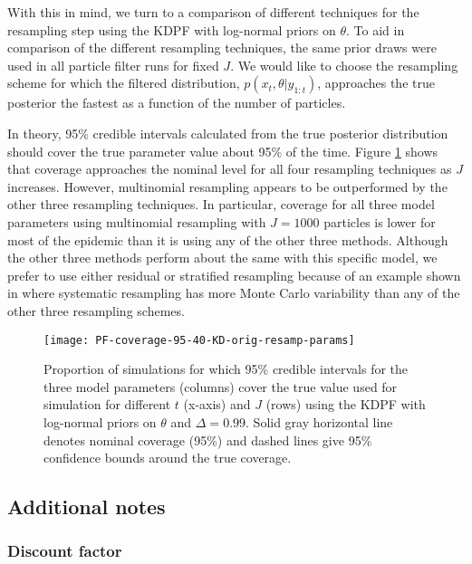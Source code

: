 \documentclass{elsarticle}
\begin{document}
With this in mind, we turn to a comparison of different techniques for the resampling step using the KDPF with log-normal priors on $\theta$. To aid in comparison of the different resampling techniques, the same prior draws were used in all particle filter runs for fixed $J$. We would like to choose the resampling scheme for which the filtered distribution, $p(x_t,\theta|y_{1:t})$, approaches the true posterior the fastest as a function of the number of particles.

In theory, 95\% credible intervals calculated from the true posterior distribution should cover the true parameter value about 95\% of the time. Figure \ref{fig:resamp} shows that coverage approaches the nominal level for all four resampling techniques as $J$ increases. However, multinomial resampling appears to be outperformed by the other three resampling techniques.  In particular, coverage for all three model parameters using multinomial resampling with $J = 1000$ particles is lower for most of the epidemic than it is using any of the other three methods. Although the other three methods perform about the same with this specific model, we prefer to use either residual or stratified resampling because of an example shown in \cite{Douc:Capp:Moul:comp:2005} where systematic resampling has more Monte Carlo variability than any of the other three resampling schemes.

\begin{figure}
\centering
\texttt{[image: PF-coverage-95-40-KD-orig-resamp-params]}
\caption{Proportion of simulations for which 95\% credible intervals for the three model parameters (columns) cover the true value used for simulation for different $t$ (x-axis) and $J$ (rows) using the KDPF with log-normal priors on $\theta$ and $\Delta = 0.99$. Solid gray horizontal line denotes nominal coverage (95\%) and dashed lines give 95\% confidence bounds around the true coverage.} \label{fig:resamp}
\end{figure}

\subsection{Additional notes \label{sec:issues}}

\subsubsection{Discount factor}
\end{document}
